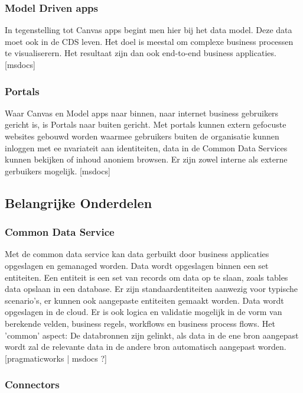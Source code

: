 \subsubsection{Model Driven apps}

In tegenstelling tot Canvas apps begint men hier bij het data model. Deze data moet ook in de CDS leven. Het doel is meestal om complexe business processen te visualiserern. Het resultaat zijn dan ook end-to-end business applicaties. [msdocs]

\subsubsection{Portals}

Waar Canvas en Model apps naar binnen, naar internet business gebruikers gericht is, is Portals naar buiten gericht. Met portals kunnen extern gefocuste websites gebouwd worden waarmee gebruikers buiten de organisatie kunnen inloggen met ee nvariateit aan identiteiten, data in de Common Data Services kunnen bekijken of inhoud anoniem browsen. Er zijn zowel interne als externe gerbuikers mogelijk. [msdocs]

\subsection{Belangrijke Onderdelen}

\subsubsection{Common Data Service}

Met de common data service kan data gerbuikt door business applicaties opgeslagen en gemanaged worden. Data wordt opgeslagen binnen een set entiteiten. Een entiteit is een set van records om data op te slaan, zoals tables data opslaan in een database. Er zijn standaardentiteiten aanwezig voor typische scenario's, er kunnen ook aangepaste entiteiten gemaakt worden. Data wordt opgeslagen in de cloud. Er is ook logica en validatie mogelijk in de vorm van berekende velden, business regels, workflows en business process flows. Het 'common' aspect: De databronnen zijn gelinkt, als data in de ene bron aangepast wordt zal de relevante data in de andere bron automatisch aangepast worden. [pragmaticworks | msdocs ?]

\subsubsection{Connectors}

